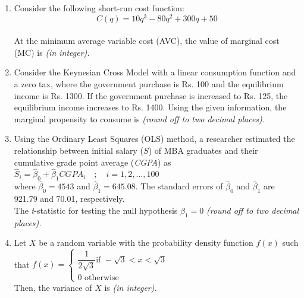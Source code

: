 \documentclass[12pt]{article}
\theoremstyle{remark}
\begin{document}
\begin{enumerate}
\hfill{}
\item  Consider the following short-run cost function: 
\hspace{1cm} $$C(q) = 10q^3 - 80q^2 + 300q + 50$$ \\
At the minimum average variable cost (AVC), the value of marginal cost (MC) is \underline{\hspace{2cm}} \textit{(in integer).} 
\\

\hfill{}
\item  Consider the Keynesian Cross Model with a linear consumption function and a zero tax, where the government purchase is Rs. 100 and the equilibrium income is Rs. 1300. If the government purchase is increased to Rs. 125, the equilibrium income increases to Rs. 1400. Using the given information, the marginal propensity to consume is \underline{\hspace{2cm}} \textit{(round off to two decimal places).} 
\\

\hfill{}
\item Using the Ordinary Least Squares (OLS) method, a researcher estimated the relationship between initial salary ($S$) of MBA graduates and their cumulative grade point average (\textit{CGPA}) as \\
\hspace{1cm} $\hat{S}_i = \hat{\beta}_0 + \hat{\beta}_1 CGPA_i \quad ; \quad i = 1, 2, \ldots, 100$ \\
where $\hat{\beta}_0 = 4543$ and $\hat{\beta}_1 = 645.08$. The standard errors of $\hat{\beta}_0$ and $\hat{\beta}_1$ are \\
921.79 and 70.01, respectively. \\
The \textit{t}-statistic for testing the null hypothesis $\beta_1 = 0$ \underline{\hspace{2cm}} \textit{(round off to two decimal places).} 
\\

\hfill{}
\item Let $X$ be a random variable with the probability density function $f(x)$ such that 
\hspace{1cm} $f(x) = \begin{cases} 
\dfrac{1}{2\sqrt{3}}  \text{if } -\sqrt{3} < x < \sqrt{3} \\
\text{$0$ otherwise}
\end{cases}$ \\
Then, the variance of $X$ is \underline{\hspace{2cm}} \textit{(in integer).} 
\\


\end{enumerate}
\end{document}
